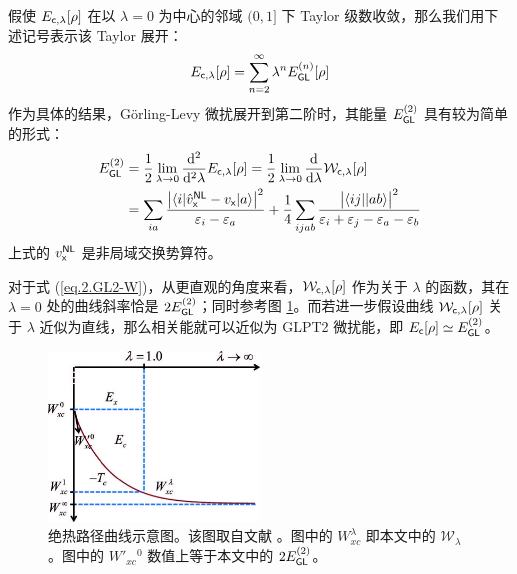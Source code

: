 假使 $E_{\textsf{c}, \lambda} [\rho]$ 在以 $\lambda=0$ 为中心的邻域 $(0, 1]$ 下 Taylor 级数收敛，那么我们用下述记号表示该 Taylor 展开：
\begin{equation}
  \label{eq.2.e-c-lambda}
  E_{\textsf{c}, \lambda} [\rho] = \sum_{n=2}^{\infty} \lambda^n E_{\textsf{GL}}^{(n)} [\rho]
\end{equation}
作为具体的结果，G\"orling-Levy 微扰展开到第二阶时，其能量 $E_{\textsf{GL}}^{(2)}$ 具有较为简单的形式：
\begin{align}
  \label{eq.2.GL2-W}
  E_{\textsf{GL}}^{(2)} &= \frac{1}{2} \lim_{\lambda \rightarrow 0} \frac{\mathrm{d}^2}{\mathrm{d}^2 \lambda} E_{\textsf{c}, \lambda} [\rho] = \frac{1}{2} \lim_{\lambda \rightarrow 0} \frac{\mathrm{d}}{\mathrm{d} \lambda} \mathcal{W}_{\textsf{c}, \lambda} [\rho] \\
  \label{eq.2.GL2-def}
  &= \sum_{ia} \frac{\big| \langle i | \hat v_{\textsf{x}}^{\textsf{NL}} - v_{\textsf{x}} | a \rangle \big|^2}{\varepsilon_i - \varepsilon_a} + \frac{1}{4} \sum_{ijab} \frac{\big| \langle ij || ab \rangle \big|^2}{\varepsilon_i + \varepsilon_j - \varepsilon_a - \varepsilon_b}
\end{align}
上式的 $v_{\textsf{x}}^{\textsf{NL}}$ 是非局域交换势算符。

对于式 (\ref{eq.2.GL2-W})，从更直观的角度来看，$\mathcal{W}_{\textsf{c}, \lambda} [\rho]$ 作为关于 $\lambda$ 的函数，其在 $\lambda = 0$ 处的曲线斜率恰是 $2 E_{\textsf{GL}}^{(2)}$；同时参考图 \ref{fig.2.adiabatic-curve}。而若进一步假设曲线 $\mathcal{W}_{\textsf{c}, \lambda} [\rho]$ 关于 $\lambda$ 近似为直线，那么相关能就可以近似为 GLPT2 微扰能，即 $E_{\textsf{c}} [\rho] \simeq E_{\textsf{GL}}^{(2)}$。

\begin{figure}[h]
  \centering
  \includegraphics[width=0.5\textwidth]{assets/adiabatic-curve.jpg}
  \caption[绝热路径曲线示意图]{绝热路径曲线示意图。该图取自文献 。图中的 $W_{xc}^{\lambda}$ 即本文中的 $\mathcal{W}_{\lambda}$。图中的 $W'_{xc}{}^{0}$ 数值上等于本文中的 $2 E_{\textsf{GL}}^{(2)}$。}
  \label{fig.2.adiabatic-curve}
\end{figure}

